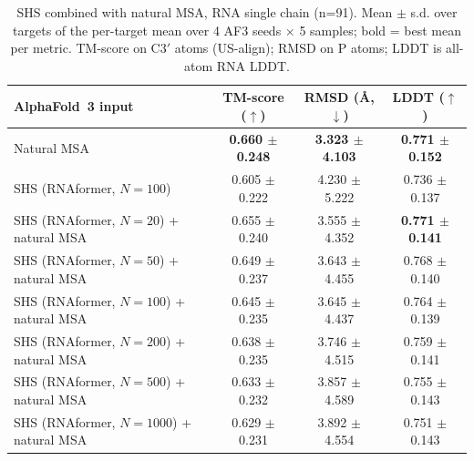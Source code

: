 \begin{table}[htbp]
\centering
\caption{SHS combined with natural MSA, RNA single chain (n=91). Mean $\pm$ s.d. over targets of the per-target mean over 4 AF3 seeds $\times$ 5 samples; bold = best mean per metric. TM-score on C3$'$ atoms (US-align); RMSD on P atoms; LDDT is all-atom RNA LDDT.}
\label{tab:shs_and_msa_depth_sweep}
\begin{tabular}{lccc}
\toprule
AlphaFold~3 input & TM-score ($\uparrow$) & RMSD (\AA, $\downarrow$) & LDDT ($\uparrow$) \\
\midrule
Natural MSA & \textbf{0.660 $\pm$ 0.248} & \textbf{3.323 $\pm$ 4.103} & \textbf{0.771 $\pm$ 0.152} \\
SHS (RNAformer, $N{=}100$) & 0.605 $\pm$ 0.222 & 4.230 $\pm$ 5.222 & 0.736 $\pm$ 0.137 \\
SHS (RNAformer, $N{=}20$) + natural MSA & 0.655 $\pm$ 0.240 & 3.555 $\pm$ 4.352 & \textbf{0.771 $\pm$ 0.141} \\
SHS (RNAformer, $N{=}50$) + natural MSA & 0.649 $\pm$ 0.237 & 3.643 $\pm$ 4.455 & 0.768 $\pm$ 0.140 \\
SHS (RNAformer, $N{=}100$) + natural MSA & 0.645 $\pm$ 0.235 & 3.645 $\pm$ 4.437 & 0.764 $\pm$ 0.139 \\
SHS (RNAformer, $N{=}200$) + natural MSA & 0.638 $\pm$ 0.235 & 3.746 $\pm$ 4.515 & 0.759 $\pm$ 0.141 \\
SHS (RNAformer, $N{=}500$) + natural MSA & 0.633 $\pm$ 0.232 & 3.857 $\pm$ 4.589 & 0.755 $\pm$ 0.143 \\
SHS (RNAformer, $N{=}1000$) + natural MSA & 0.629 $\pm$ 0.231 & 3.892 $\pm$ 4.554 & 0.751 $\pm$ 0.143 \\
\bottomrule
\end{tabular}
\end{table}

